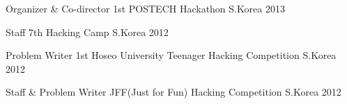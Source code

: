 
\begin{cvhonors}

  \cvhonor
  {Organizer \& Co-director} %
  {1st POSTECH Hackathon} %
  {S.Korea} %
  {2013} %

  \cvhonor
  {Staff} %
  {7th Hacking Camp} %
  {S.Korea} %
  {2012} %

  \cvhonor
  {Problem Writer} %
  {1st Hoseo University Teenager Hacking Competition} %
  {S.Korea} %
  {2012} %

  \cvhonor
  {Staff \& Problem Writer} %
  {JFF(Just for Fun) Hacking Competition} %
  {S.Korea} %
  {2012} %

\end{cvhonors}

